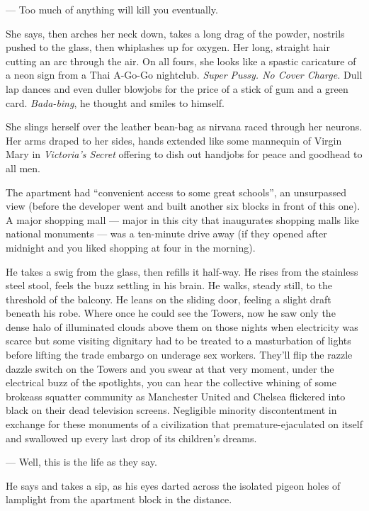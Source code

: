 \documentclass[11pt]{article}
\begin{document}
	--- Too much of anything will kill you eventually.

	She says, then arches her neck down, takes a long drag of the powder,
nostrils pushed to the glass, then whiplashes up for oxygen. Her long, straight 
hair cutting an arc through the air. On all fours, she looks like a spastic 
caricature of a neon sign from a Thai A-Go-Go nightclub. \emph{Super Pussy. No Cover 
Charge.} Dull lap dances and even duller blowjobs for the price of a stick of 
gum and a green card. \emph{Bada-bing}, he thought and smiles to himself.

	She slings herself over the leather bean-bag as nirvana raced through her 
neurons. Her arms draped to her sides, hands extended like some mannequin of 
Virgin Mary in \emph{Victoria's Secret} offering to dish out handjobs for peace and 
goodhead to all men.

	The apartment had ``convenient access to some great schools'', an unsurpassed
view (before the developer went and built another six blocks in front of this 
one). A major shopping mall --- major in this city that inaugurates shopping 
malls like national monuments --- was a ten-minute drive away (if they opened 
after midnight and you liked shopping at four in the morning).

	He takes a swig from the glass, then refills it half-way. He rises from the 
stainless steel stool, feels the buzz settling in his brain. He walks, steady 
still, to the threshold of the balcony. He leans on the sliding door, feeling a 
slight draft beneath his robe. Where once he could see the Towers, now he saw 
only the dense halo of illuminated clouds above them on those nights when 
electricity was scarce but some visiting dignitary had to be treated to a 
masturbation of lights before lifting the trade embargo on underage sex 
workers. They'll flip the razzle dazzle switch on the Towers and you swear at 
that very moment, under the electrical buzz of the spotlights, you can hear the 
collective whining of some brokeass squatter community as Manchester United and 
Chelsea flickered into black on their dead television screens. Negligible 
minority discontentment in exchange for these monuments of a civilization that 
premature-ejaculated on itself and swallowed up every last drop of its 
children's dreams.

	--- Well, this is the life as they say.

	He says and takes a sip, as his eyes darted across the isolated pigeon 
holes of lamplight from the apartment block in the distance.
\end{document}
